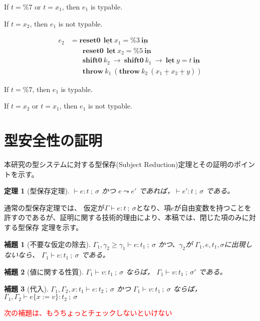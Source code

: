 \documentclass[T]{compsoft}
\newcommand\red[1]{\textcolor{red}{#1}}
\newcommand\Resetz{\textbf{reset0}}
\newcommand\Shiftz{\textbf{shift0}}
\newcommand\Throw{\textbf{throw}}
\newcommand\cPlus{\underline{\textbf{+}}}
\newcommand\cLet{\underline{\textbf{let}}}
\newcommand\cIn{\underline{\textbf{in}}}
\newcommand\csp[1]{\texttt{\%}{#1}}
\newcommand\ord{\ge}
\newcommand\lto{\leadsto}
\newcommand\kam[1]{\red{{#1}}}
\theoremstyle{break}
\newtheorem{theo}{定理}[section]
\newtheorem{lemm}{補題}[section]
\begin{document}
If $t=\csp{7}$ or $t=x_1$, then $e_1$ is typable.

If $t=x_2$, then $e_1$ is not typable.

\begin{align*}
  e_2 & = \Resetz ~~\cLet~x_1=\csp{3}~\cIn \\
      & \phantom{=}~~ \Resetz ~~\cLet~x_2=\csp{5}~\cIn \\
      & \phantom{=}~~ \Shiftz~k_2~\to~ \Shiftz~k_1~\to~ \cLet~y=t~\cIn \\
      & \phantom{=}~~ \Throw~k_1~(\Throw~k_2~(x_1~\cPlus~x_2~\cPlus~y))
\end{align*}

If $t=\csp{7}$, then $e_1$ is typable.

If $t=x_2$ or $t=x_1$, then $e_1$ is not typable.

\section{型安全性の証明}

本研究の型システムに対する型保存(Subject Reduction)定理とその証明のポイントを示す。

\begin{theo}[型保存定理]
$\vdash e:t~;~\sigma$ かつ $e \lto e'$ であれば，$\vdash e':t~;~\sigma$ である。
\end{theo}

通常の型保存定理では、
仮定が$\Gamma \vdash e:t~;~\sigma$となり、項$e$が自由変数を持つことを
許すのであるが、証明に関する技術的理由により、本稿では、閉じた項のみに対する型保存
定理を示す。

\begin{lemm}[不要な仮定の除去]
  $\Gamma_1,\gamma_2 \ord \gamma_1 \vdash e : t_1 ~;~\sigma$
  かつ、$\gamma_2$が $\Gamma_1, e, t_1, \sigma$に出現しないなら、
  $\Gamma_1 \vdash e : t_1 ~;~\sigma$ である。
\end{lemm}

\begin{lemm}[値に関する性質]
  $\Gamma_1 \vdash v : t_1 ~;~\sigma$
  ならば，
  $\Gamma_1 \vdash v : t_1 ~;~\sigma'$
  である。
\end{lemm}

\begin{lemm}[代入]
  $\Gamma_1, \Gamma_2, x : t_1 \vdash e : t_2 ~;~\sigma$
  かつ
  $\Gamma_1 \vdash v : t_1 ~;~\sigma$
  ならば，
  $\Gamma_1, \Gamma_2 \vdash e\{x := v\} : t_2~;~\sigma$
\end{lemm}


\kam{次の補題は、もうちょっとチェックしないといけない}
\end{document}
